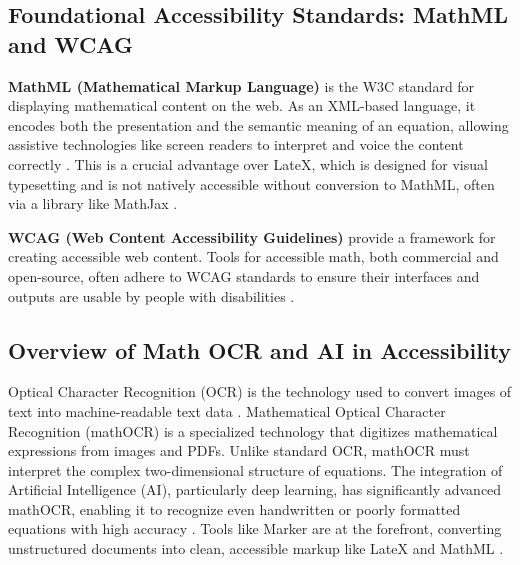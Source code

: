 \subsection{Foundational Accessibility Standards: MathML and WCAG}\label{ch11:ssec:standards}
\textbf{\gls{MathML} (Mathematical Markup Language)} is the W3C standard for displaying mathematical content on the web. As an \gls{XML}-based language, it encodes both the presentation and the semantic meaning of an equation, allowing assistive technologies like screen readers to interpret and voice the content correctly \supercite{W3CMathML, W3CMathML3, W3CMathML4}. This is a crucial advantage over \gls{LateX}, which is designed for visual typesetting and is not natively accessible without conversion to \gls{MathML}, often via a library like MathJax \supercite{MathJax, LaTeXProject}.

\textbf{\gls{WCAG} (Web Content Accessibility Guidelines)} provide a framework for creating accessible web content. Tools for accessible math, both commercial and open-source, often adhere to \gls{WCAG} standards to ensure their interfaces and outputs are usable by people with disabilities \supercite{WCAG20, WCAG21W3C2018}.

\subsection{Overview of Math OCR and AI in Accessibility}\label{ch11:ssec:math-ocr-ai}
Optical Character Recognition (OCR) is the technology used to convert images of text into machine-readable text data \supercite{AdobeOCR, ContinualEngineOCR}. Mathematical Optical Character Recognition (\gls{mathOCR}) is a specialized technology that digitizes mathematical expressions from images and PDFs. Unlike standard \gls{OCR}, \gls{mathOCR} must interpret the complex two-dimensional structure of equations. The integration of Artificial Intelligence (\gls{AI}), particularly deep learning, has significantly advanced \gls{mathOCR}, enabling it to recognize even handwritten or poorly formatted equations with high accuracy \supercite{AIinOCR, DeepLearningOCROverview, ArxivMER2103}. Tools like Marker are at the forefront, converting unstructured documents into clean, accessible markup like \gls{LateX} and \gls{MathML} \supercite{Marker, MarkerDocs}.

